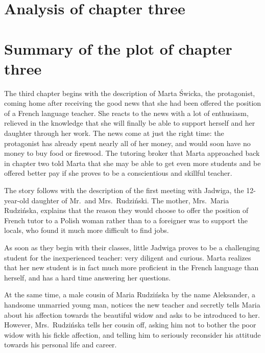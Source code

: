 \section{Analysis of chapter three}
\section{Summary of the plot of chapter three}

The third chapter begins with the description of Marta Świcka, the protagonist, coming home after receiving the good news that she had been offered the position of a French language teacher.
She reacts to the news with a lot of enthusiasm, relieved in the knowledge that she will finally be able to support herself and her daughter through her work.
The news come at just the right time: the protagonist has already spent nearly all of her money, and would soon have no money to buy food or firewood.
The tutoring broker that Marta approached back in chapter two told Marta that she may be able to get even more students and be offered better pay if she proves to be a conscientious and skillful teacher.

The story follows with the description of the first meeting with Jadwiga, the 12-year-old daughter of Mr.\ and Mrs.\ Rudziński.
The mother, Mrs.\ Maria Rudzińska, explains that the reason they would choose to offer the position of French tutor to a Polish woman rather than to a foreigner was to support the locals, who found it much more difficult to find jobs.

As soon as they begin with their classes, little Jadwiga proves to be a challenging student for the inexperienced teacher: very diligent and curious.
Marta realizes that her new student is in fact much more proficient in the French language than herself, and has a hard time answering her questions.

At the same time, a male cousin of Maria Rudzińska by the name Aleksander, a handsome unmarried young man, notices the new teacher and secretly tells Maria about his affection towards the beautiful widow and asks to be introduced to her.
However, Mrs.\ Rudzińska tells her cousin off, asking him not to bother the poor widow with his fickle affection, and telling him to seriously reconsider his attitude towards his personal life and career.
